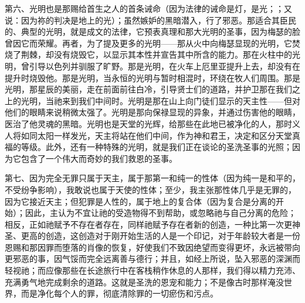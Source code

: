 第六、光明也是那赐给首生之人的首条诫命（因为法律的诫命是灯，是光；\newline{}；又说：因为祢的判决是地上的光）；虽然嫉妒的黑暗潜入，行了邪恶。\newline{}那适合其臣民的、典型的光明，就是成文的法律，它预表真理和那大光明的圣事，因为梅瑟的脸曾因它而荣耀。\newline{}再者，为了提及更多的光明——\newline{}那从火中向梅瑟显现的光明，它焚烧了荆棘，却没有烧毁它，以显示其本性并宣告其中所含的能力。\newline{}那在火柱中的光明，曾引导以色列并驯服了旷野。\newline{}那是光明，在火车上厄里亚提升上去，\newline{}却没有在提升时烧毁他。\newline{}那是光明，当永恒的光明与暂时相混时，环绕在牧人们周围。\newline{}那是光明，那星辰的美丽，走在前面前往白冷，引导贤士们的道路，\newline{}并护卫那在我们之上的光明，当祂来到我们中间时。\newline{}光明是那在山上向门徒们显示的天主性——但对他们的眼睛来说稍微太强了。\newline{}光明是那向保禄显现的异象，\newline{}并通过伤害他的眼睛，医治了他灵魂的黑暗。\newline{}光明也是天堂的光辉，给那些在此地已被净化的人，那时义人将如同太阳一样发光，\newline{}天主将站在他们中间，\newline{}作为神和君王，决定和区分天堂真福的等级。\newline{}此外，还有一种特殊的光明，就是我们正在谈论的圣洗圣事的光照；因为它包含了一个伟大而奇妙的我们救恩的圣事。\par

第七、因为完全无罪只属于天主，属于那第一和纯一的性体（因为纯一是和平的，不受纷争影响），我敢说也属于天使的性体；至少，我主张那性体几乎是无罪的，因为它接近天主；但犯罪是人性的，属于地上的复合体（因为复合是分离的开始）；因此，主认为不宜让祂的受造物得不到帮助，或忽略祂与自己分离的危险；相反，正如祂赋予不存在者存在，同样祂赋予存在者新的创造，一种比第一次更神圣、更高的创造，这创造对于刚开始生活的人是一个印记，对于年龄较大者是一份恩赐和那因罪而堕落的肖像的恢复，好使我们不致因绝望而变得更坏，永远被带向更邪恶的事，因气馁而完全远离善与德行；并且，如经上所说，坠入邪恶的深渊而轻视祂；而应像那些在长途旅行中在客栈稍作休息的人那样，我们得以精力充沛、充满勇气地完成剩余的道路。这就是圣洗的恩宠和能力；不是像古时那样淹没世界，而是净化每个人的罪，彻底清除罪的一切瘀伤和污点。\par

